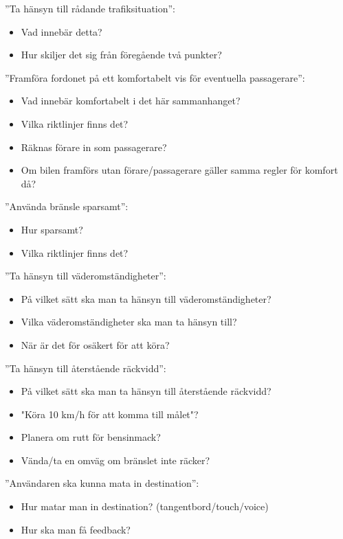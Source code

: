\documentclass[10pt]{article}
\begin{document}
\noindent ”Ta hänsyn till rådande trafiksituation”:
\begin{itemize}
\item Vad innebär detta?
\item Hur skiljer det sig från föregående två punkter?
\end{itemize}
\hfill \break

\noindent ”Framföra fordonet på ett komfortabelt vis för eventuella passagerare”:
\begin{itemize}
\item Vad innebär komfortabelt i det här sammanhanget? 
\item Vilka riktlinjer finns det?
\item Räknas förare in som passagerare?
\item Om bilen framförs utan förare/passagerare gäller samma regler för komfort då?
\end{itemize}
\hfill \break

\noindent ”Använda bränsle sparsamt”:
\begin{itemize}
\item Hur sparsamt? 
\item Vilka riktlinjer finns det?
\end{itemize}
\hfill \break

\noindent ”Ta hänsyn till väderomständigheter”:
\begin{itemize}
\item På vilket sätt ska man ta hänsyn till väderomständigheter?
\item Vilka väderomständigheter ska man ta hänsyn till?
\item När är det för osäkert för att köra?
\end{itemize}
\hfill \break

\noindent ”Ta hänsyn till återstående räckvidd”:
\begin{itemize}
\item På vilket sätt ska man ta hänsyn till återstående räckvidd?
\item "Köra 10 km/h för att komma till målet"?
\item Planera om rutt för bensinmack?
\item Vända/ta en omväg om bränslet inte räcker?
\end{itemize}
\hfill \break

\noindent ”Användaren ska kunna mata in destination”:
\begin{itemize}
\item Hur matar man in destination? (tangentbord/touch/voice)
\item Hur ska man få feedback?
\end{itemize}
\hfill \break
\end{document}

